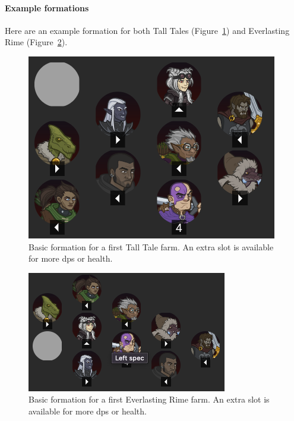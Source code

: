 \documentclass{article}
\begin{document}
\paragraph{Example formations}

Here are an example formation for both Tall Tales (Figure~\ref{fig:fourJumpsTallTale}) and Everlasting Rime (Figure~\ref{fig:fourJumpsEverlastingRime}).

\begin{figure}[ht!]
    \centering
    \includegraphics[width=\linewidth]{fourJumpsTallTale}
    \caption{Basic formation for a first Tall Tale farm.
    An extra slot is available for more dps or health.}
    \label{fig:fourJumpsTallTale}
\end{figure}


\begin{figure}[ht!]
    \centering
    \includegraphics[width=\linewidth]{fourJumpsEverlastingRime}
    \caption{Basic formation for a first Everlasting Rime farm.
    An extra slot is available for more dps or health.}
    \label{fig:fourJumpsEverlastingRime}
\end{figure}
\end{document}
